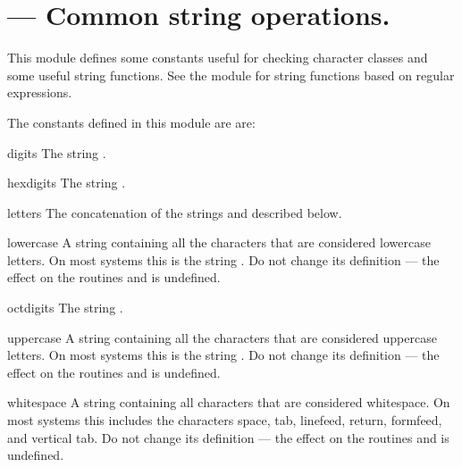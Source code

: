 \section{ ---
         Common string operations.}



This module defines some constants useful for checking character
classes and some useful string functions.  See the module
 for string functions based on regular
expressions.

The constants defined in this module are are:

\begin{datadesc}{digits}
  The string .
\end{datadesc}

\begin{datadesc}{hexdigits}
  The string .
\end{datadesc}

\begin{datadesc}{letters}
  The concatenation of the strings  and
   described below.
\end{datadesc}

\begin{datadesc}{lowercase}
  A string containing all the characters that are considered lowercase
  letters.  On most systems this is the string
  .  Do not change its definition ---
  the effect on the routines  and
   is undefined.
\end{datadesc}

\begin{datadesc}{octdigits}
  The string .
\end{datadesc}

\begin{datadesc}{uppercase}
  A string containing all the characters that are considered uppercase
  letters.  On most systems this is the string
  .  Do not change its definition ---
  the effect on the routines  and
   is undefined.
\end{datadesc}

\begin{datadesc}{whitespace}
  A string containing all characters that are considered whitespace.
  On most systems this includes the characters space, tab, linefeed,
  return, formfeed, and vertical tab.  Do not change its definition ---
  the effect on the routines  and 
  is undefined.
\end{datadesc}

